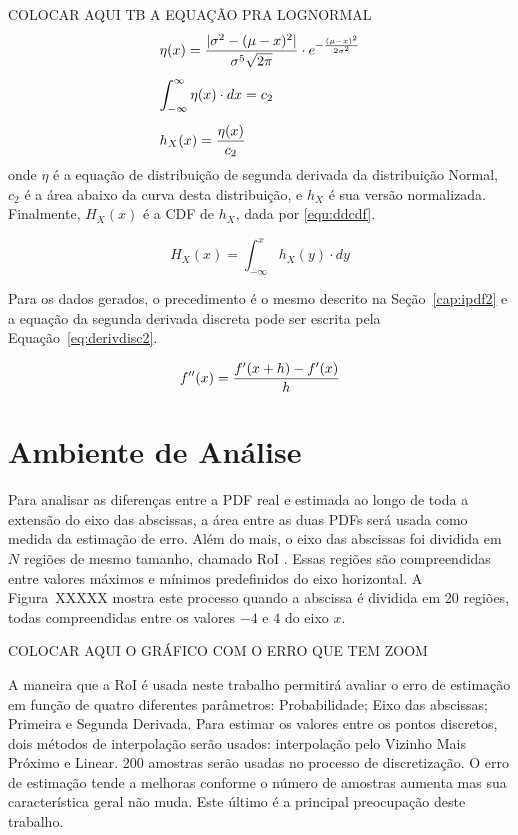 \color{red} COLOCAR AQUI TB A EQUAÇÃO PRA LOGNORMAL \color{black}
\begin{equation}
\begin{array}{l}
\vspace{0.3cm}\displaystyle \eta(x) = \frac{|\sigma^2 - (\mu - x)^2|}{ \sigma^5\sqrt{2\pi}}\cdot e^{-\frac{(\mu - x)^2}{2 \sigma^2}} \\
\vspace{0.3cm} \displaystyle \int_{-\infty}^{\infty} \eta(x)\cdot dx = c_2 \\
\displaystyle h_X(x) = \frac{\eta(x)}{c_2}
\label{equ:hx}
\end{array}
\end{equation}
onde $\eta$ é a equação de distribuição de segunda derivada da distribuição Normal, $c_2$ é a área abaixo da curva desta distribuição, e $h_X$ é sua versão normalizada. 
Finalmente, $H_X(x)$ é a \ac{CDF} de $h_X$, dada por \eqref{equ:ddcdf}.

\begin{equation}
H_X(x) = \int_{-\infty}^x h_X(y)\cdot dy
\label{equ:ddcdf}
\end{equation}

Para os dados gerados, o precedimento é o mesmo descrito na Seção~\ref{cap:ipdf2} e a equação da segunda derivada discreta pode ser escrita pela Equação~\ref{eq:derivdisc2}.

\begin{equation}
{\displaystyle f''(x) = {f'(x+h)-f'(x) \over h}}
\label{eq:derivdisc2}
\end{equation}

\section{Ambiente de Análise}
Para analisar as diferenças entre a \ac{PDF} real e estimada ao longo de toda a extensão do eixo das abscissas, a área entre as duas \ac{PDF}s será usada como medida da estimação de erro. Além do mais, o eixo das abscissas foi dividida em $N$ regiões de mesmo tamanho, chamado \ac{RoI} \cite{ron1999art}. Essas regiões são compreendidas entre valores máximos e mínimos predefinidos do eixo horizontal. A Figura~XXXXX mostra este processo quando a abscissa é dividida em 20 regiões, todas compreendidas entre os valores $-4$ e $4$ do eixo $ x $.


{\color{red} COLOCAR AQUI O GRÁFICO COM O ERRO QUE TEM ZOOM}

A maneira que a \ac{RoI} é usada neste trabalho permitirá avaliar o erro de estimação em função de quatro diferentes parâmetros: Probabilidade; Eixo das abscissas; Primeira e Segunda Derivada. Para estimar os valores entre os pontos discretos, dois métodos de interpolação serão usados: interpolação pelo Vizinho Mais Próximo e Linear. 200 amostras serão usadas no processo de discretização. O erro de estimação tende a melhoras conforme o número de amostras aumenta mas sua característica geral não muda. Este último é a principal preocupação deste trabalho.

